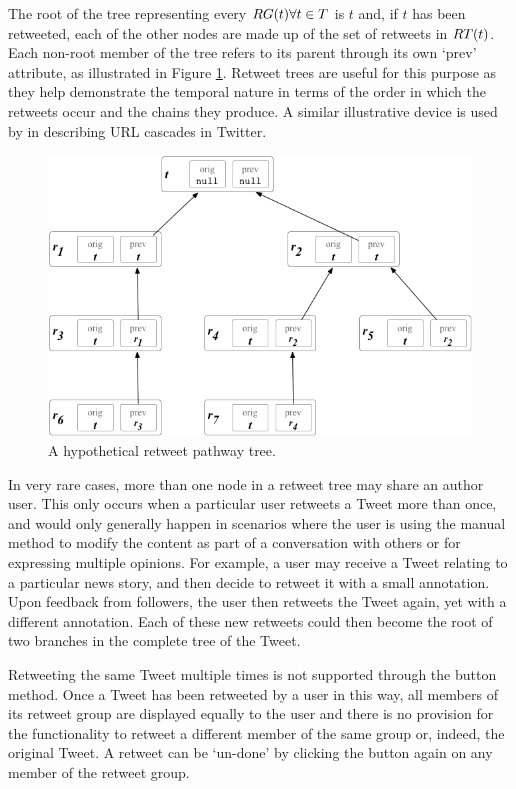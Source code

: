 The root of the tree representing every $RG(t) \forall t \in T$ is $t$ and, if $t$ has been retweeted, each of the other nodes are made up of the set of retweets in $RT(t)$. Each non-root member of the tree refers to its parent through its own `$\textrm{prev}$' attribute, as illustrated in Figure \ref{fig:retweet_tree}. Retweet trees are useful for this purpose as they help demonstrate the temporal nature in terms of the order in which the retweets occur and the chains they produce. A similar illustrative device is used by \cite{galuba10} in describing URL cascades in Twitter.

\begin{figure}[h]
\centering
\includegraphics[scale=0.6]{3.Chapter1/Media/tree.png} 
\caption{A hypothetical retweet pathway tree.}
\label{fig:retweet_tree}
\end{figure}

In very rare cases, more than one node in a retweet tree may share an author user. This only occurs when a particular user retweets a Tweet more than once, and would only generally happen in scenarios where the user is using the manual method to modify the content as part of a conversation with others or for expressing multiple opinions. For example, a user may receive a Tweet relating to a particular news story, and then decide to retweet it with a small annotation. Upon feedback from followers, the user then retweets the Tweet again, yet with a different annotation. Each of these new retweets could then become the root of two branches in the complete tree of the Tweet.

Retweeting the same Tweet multiple times is not supported through the button method. Once a Tweet has been retweeted by a user in this way, all members of its retweet group are displayed equally to the user and there is no provision for the functionality to retweet a different member of the same group or, indeed, the original Tweet. A retweet can be `un-done' by clicking the button again on any member of the retweet group.


